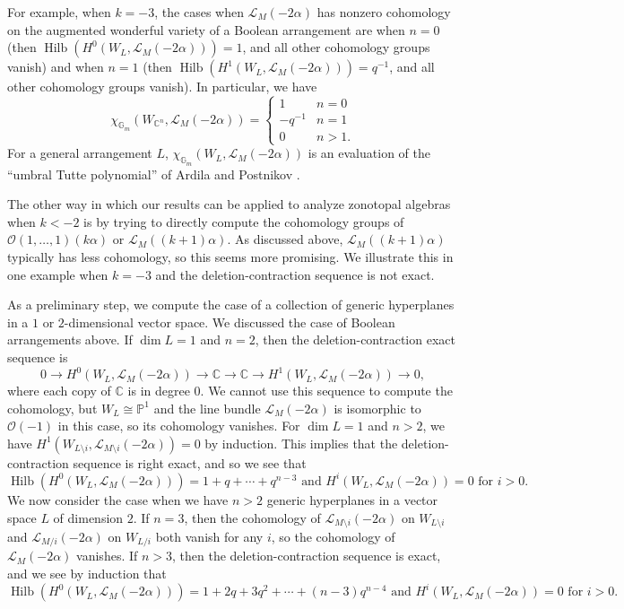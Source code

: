 \documentclass{amsart}
\theoremstyle{definition}
\begin{document}
For example, when $k = -3$, the cases when $\mathcal{L}_M(-2\alpha)$ has nonzero cohomology on the augmented wonderful variety of a Boolean arrangement are when $n = 0$ (then $\operatorname{Hilb}(H^0(W_L, \mathcal{L}_M(-2\alpha))) = 1$, and all other cohomology groups vanish) and when $n=1$ (then $\operatorname{Hilb}(H^1(W_L, \mathcal{L}_M(-2\alpha))) = q^{-1}$, and all other cohomology groups vanish). In particular, we have
$$\chi_{\mathbb{G}_m}(W_{\mathbb{C}^n}, \mathcal{L}_M(-2\alpha)) = \begin{cases} 1 & n=0 \\ -q^{-1} & n=1 \\ 0 & n > 1.\end{cases}$$
For a general arrangement $L$, $\chi_{\mathbb{G}_m}(W_L, \mathcal{L}_M(-2\alpha))$ is an evaluation of the ``umbral Tutte polynomial'' of Ardila and Postnikov \cite[Proposition 4.11]{ArdilaPostnikov}. 

\medskip

The other way in which our results can be applied to analyze zonotopal algebras when $k < -2$ is by trying to directly compute the cohomology groups of $\mathcal{O}(1, \dotsc, 1)(k \alpha)$ or $\mathcal{L}_M((k+1)\alpha)$. As discussed above, $\mathcal{L}_M((k+1)\alpha)$ typically has less cohomology, so this seems more promising. We illustrate this in one example when $k = -3$ and the  deletion-contraction sequence is not exact. 

As a preliminary step, we compute the case of a collection of generic hyperplanes in a $1$ or $2$-dimensional vector space. We discussed the case of Boolean arrangements above. If $\dim L = 1$ and $n=2$, then the deletion-contraction exact sequence is 
$$0 \to H^0(W_L, \mathcal{L}_M(-2\alpha)) \to \mathbb{C} \to \mathbb{C} \to H^1(W_L, \mathcal{L}_M(-2\alpha)) \to 0,$$
where each copy of $\mathbb{C}$ is in degree $0$. We cannot use this sequence to compute the cohomology, but $W_L \cong \mathbb{P}^1$ and the line bundle $\mathcal{L}_M(-2\alpha)$ is isomorphic to $\mathcal{O}(-1)$ in this case, so its cohomology vanishes. For $\dim L = 1$ and $n > 2$, we have $H^1(W_{L \setminus i}, \mathcal{L}_{M \setminus i}(-2\alpha)) = 0$ by induction. This implies that the deletion-contraction sequence is right exact, and so we see that
$$\operatorname{Hilb}(H^0(W_L, \mathcal{L}_M(-2\alpha))) = 1 + q + \dotsb + q^{n-3} \text{ and }H^i(W_L, \mathcal{L}_M(-2\alpha)) = 0 \text{ for }i>0.$$
We now consider the case when we have $n > 2$ generic hyperplanes in a vector space $L$ of dimension $2$. If $n = 3$, then the cohomology of $\mathcal{L}_{M \setminus i}(-2\alpha)$ on $W_{L \setminus i}$ and $\mathcal{L}_{M/i}(-2\alpha)$ on $W_{L/i}$ both vanish for any $i$, so the cohomology of $\mathcal{L}_M(-2\alpha)$ vanishes. If $n > 3$, then the deletion-contraction sequence is exact, and we see by induction that
$$\operatorname{Hilb}(H^0(W_L, \mathcal{L}_M(-2\alpha))) = 1 + 2q + 3q^2 + \dotsb + (n-3)q^{n-4}\text{ and }H^i(W_L, \mathcal{L}_M(-2\alpha)) = 0 \text{ for }i>0.$$
\end{document}
